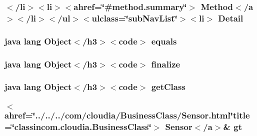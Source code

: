 \hypertarget{_station_8html_a1e04b5ec07bcd5281e26dcd40e5b3a94}{
\subsubsection[{Detail}]{\setlength{\rightskip}{0pt plus 5cm}$<$/li$>$$<$li$>$$<$ahref=\char`\"{}\#method.\-summary\char`\"{}$>$ Method$<$/{\bf a}$>$$<$/li$>$$<$/ul$>$$<$ulclass=\char`\"{}sub\-Nav\-List\char`\"{}$>$$<$li$>$ Detail}}\label{_station_8html_a1e04b5ec07bcd5281e26dcd40e5b3a94}
\hypertarget{_station_8html_a8974318cea585f72df717e0380ec7104}{
\subsubsection[{equals}]{\setlength{\rightskip}{0pt plus 5cm}java lang Object$<$/h3$>$$<$code$>$ equals}}\label{_station_8html_a8974318cea585f72df717e0380ec7104}
\hypertarget{_station_8html_ab2315181ead4aeedef2374039b6ddde7}{
\subsubsection[{finalize}]{\setlength{\rightskip}{0pt plus 5cm}java lang Object$<$/h3$>$$<$code$>$ finalize}}\label{_station_8html_ab2315181ead4aeedef2374039b6ddde7}
\hypertarget{_station_8html_a98e6644727fe65eac217a6855045be43}{
\subsubsection[{get\-Class}]{\setlength{\rightskip}{0pt plus 5cm}java lang Object$<$/h3$>$$<$code$>$ get\-Class}}\label{_station_8html_a98e6644727fe65eac217a6855045be43}
\hypertarget{_station_8html_aad64e630bab1a992ddc6a0aa39811222}{
\subsubsection[{gt}]{\setlength{\rightskip}{0pt plus 5cm}$<$ahref=\char`\"{}../../../com/cloudia/Business\-Class/Sensor.\-html\char`\"{}title=\char`\"{}classincom.\-cloudia.\-Business\-Class\char`\"{}$>$ Sensor$<$/{\bf a}$>$\& gt}}\label{_station_8html_aad64e630bab1a992ddc6a0aa39811222}
